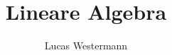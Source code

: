 \documentclass[12pt,a4paper]{article}
\title{Lineare Algebra}
\author{Lucas Westermann}
\begin{document}
\maketitle
\pagebreak


\end{document}
